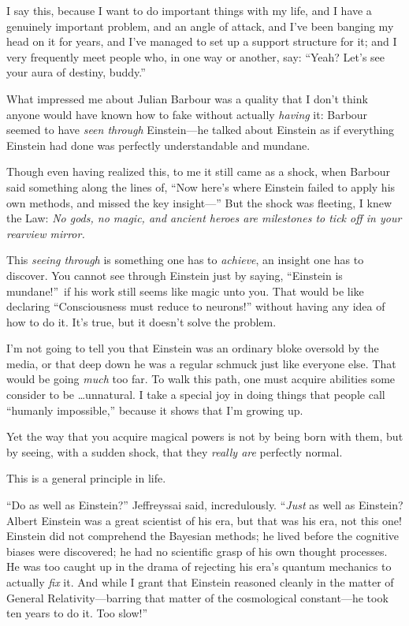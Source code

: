 {
 I say this, because I want to do important things with my life,
and I have a genuinely important problem, and an angle of attack, and
I've been banging my head on it for years, and
I've managed to set up a support structure for it; and
I very frequently meet people who, in one way or another, say:
``Yeah? Let's see your aura of
destiny, buddy.''}

{
 What impressed me about Julian Barbour was a quality that I
don't think anyone would have known how to fake without
actually \textit{having} it: Barbour seemed to have \textit{seen
through} Einstein---he talked about Einstein as if everything Einstein
had done was perfectly understandable and mundane.}

{
 Though even having realized this, to me it still came as a shock,
when Barbour said something along the lines of, ``Now
here's where Einstein failed to apply his own methods,
and missed the key insight---'' But the shock was
fleeting, I knew the Law: \textit{No gods, no magic, and ancient heroes
are milestones to tick off in your rearview mirror.}}

{
 This \textit{seeing through} is something one has to
\textit{achieve}, an insight one has to discover. You cannot see
through Einstein just by saying, ``Einstein is
mundane!''~if his work still seems like magic unto
you. That would be like declaring ``Consciousness must
reduce to neurons!'' without having any idea of how
to do it. It's true, but it doesn't
solve the problem.}

{
 I'm not going to tell you that Einstein was an
ordinary bloke oversold by the media, or that deep down he was a
regular schmuck just like everyone else. That would be going
\textit{much} too far. To walk this path, one must acquire abilities
some consider to be \ldots unnatural. I take a special joy in doing
things that people call ``humanly
impossible,'' because it shows that
I'm growing up.}

{
 Yet the way that you acquire magical powers is not by being born
with them, but by seeing, with a sudden shock, that they \textit{really
are} perfectly normal.}

{
 This is a general principle in life.}

\myendsectiontext


\bigskip


{
 ``Do as well as Einstein?''
Jeffreyssai said, incredulously. ``\textit{Just} as
well as Einstein? Albert Einstein was a great scientist of his era, but
that was his era, not this one! Einstein did not comprehend the
Bayesian methods; he lived before the cognitive biases were discovered;
he had no scientific grasp of his own thought processes. He was too
caught up in the drama of rejecting his era's quantum
mechanics to actually \textit{fix} it. And while I grant that Einstein
reasoned cleanly in the matter of General Relativity---barring that
matter of the cosmological constant---he took ten years to do it. Too
slow!'' }

